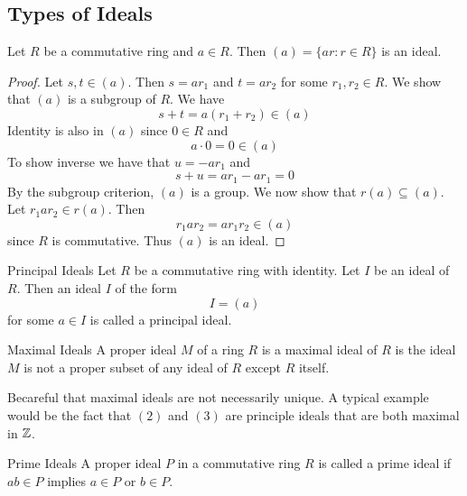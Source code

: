 \documentclass[a4paper]{article}
\begin{document}
\subsection{Types of Ideals}
\begin{lmm}{}{} Let $R$ be a commutative ring and $a\in R$. Then $(a)=\{ar:r\in R\}$ is an ideal. \tcbline
\begin{proof}
Let $s,t\in(a)$. Then $s=ar_1$ and $t=ar_2$ for some $r_1,r_2\in R$. We show that $(a)$ is a subgroup of $R$. We have $$s+t=a(r_1+r_2)\in(a)$$ Identity is also in $(a)$ since $0\in R$ and $$a\cdot 0=0\in(a)$$ To show inverse we have that $u=-ar_1$ and $$s+u=ar_1-ar_1=0$$ By the subgroup criterion, $(a)$ is a group. We now show that $r(a)\subseteq(a)$. Let $r_1ar_2\in r(a)$. Then $$r_1ar_2=ar_1r_2\in(a)$$ since $R$ is commutative. Thus $(a)$ is an ideal. 
\end{proof}
\end{lmm}

\begin{defn}{Principal Ideals}{} Let $R$ be a commutative ring with identity. Let $I$ be an ideal of $R$. Then an ideal $I$ of the form $$I=(a)$$ for some $a\in I$ is called a principal ideal. 
\end{defn}

\begin{defn}{Maximal Ideals}{} A proper ideal $M$ of a ring $R$ is a maximal ideal of $R$ is the ideal $M$ is not a proper subset of any ideal of $R$ except $R$ itself. 
\end{defn}

Becareful that maximal ideals are not necessarily unique. A typical example would be the fact that $(2)$ and $(3)$ are principle ideals that are both maximal in $\mathbb{Z}$. 

\begin{defn}{Prime Ideals}{} A proper ideal $P$ in a commutative ring $R$ is called a prime ideal if $ab\in P$ implies $a\in P$ or $b\in P$. 
\end{defn}
\end{document}
